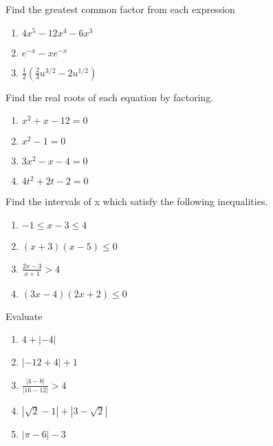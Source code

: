 \documentclass[11pt]{article}
\newenvironment{problem}[2][Problem]{\begin{trivlist}
\item[\hskip \labelsep {\bfseries #1}\hskip \labelsep {\bfseries #2.}]}{\end{trivlist}}
\newenvironment{sol}
    {\emph{Solution:}
    }
    {
    \qed
    }
\begin{document}
\begin{problem}{4}
  Find the greatest common factor from each expression
  \begin{enumerate}[label=\roman*)]
  \item $4x^5-12x^4-6x^3$
  \item $e^{-x}-xe^{-x}$
    \item $\displaystyle \frac{1}{2}\left(\frac{2}{3}u^{3/2}-2u^{1/2}\right)$
  \end{enumerate}
  
\end{problem}



\begin{problem}{5}
  Find the real roots of each equation by factoring.
  \begin{enumerate}[label=\roman*)]
  \item $x^2+x-12=0$
  \item $x^2 -1=0$  
  \item $ 3x^2-x-4=0$
  \item $4t^2+2t-2=0$
  \end{enumerate}
  
\end{problem}


\begin{problem}{6}
Find the intervals of x which satisfy the following inequalities.
  \begin{enumerate}[label=\roman*)]
  \item $-1\leq x-3 \leq 4$
  \item $(x+3)(x-5)\leq 0$  
  \item $ \displaystyle \frac{2x-3}{x+1}>4$
  \item $(3x-4)(2x+2)\leq 0$
  \end{enumerate}
  
\end{problem}

\begin{problem}{7}
Evaluate
  \begin{enumerate}[label=\roman*)]
  \item $4 + |-4|$
  \item $|-12+4|+1$  
  \item $ \displaystyle \frac{|4-8|}{|16-12|}>4$
  \item $|\sqrt{2}-1|+|3-\sqrt{2}|$
    \item $|\pi -6|-3$
  \end{enumerate}
  
\end{problem}
\end{document}
